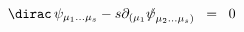 \begin{equation}
\dirac \, \psi_{\mu_1 ... \mu_s} - s \partial_{( \mu_1}
{{\not}\psi}_{\mu_2 ... \mu_s )} \;\; =\;\; 0
\label{eq:3.4}
\end{equation}

